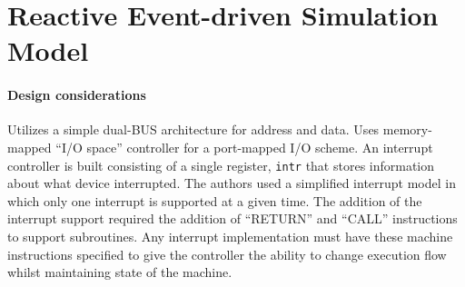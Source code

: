 \chapter{Reactive Event-driven Simulation Model}
\label{ch:event-driven-simulation}

\subsubsection{Design considerations\cite{Nakamura2013}}

Utilizes a simple dual-BUS architecture for address and data. Uses memory-mapped ``I/O space'' controller for a port-mapped I/O scheme. An interrupt controller is built consisting of a single register, \verb|intr| that stores information about what device interrupted. The authors used a simplified interrupt model in which only one interrupt is supported at a given time. The addition of the interrupt support required the addition of ``RETURN'' and ``CALL'' instructions to support subroutines. Any interrupt implementation must have these machine instructions specified to give the controller the ability to change execution flow whilst maintaining state of the machine. 